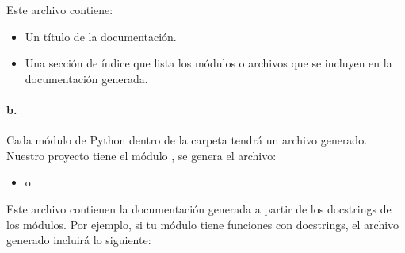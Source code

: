 \documentclass[a4paper,10pt,spanish]{sphinxmanual}
\begin{document}
\sphinxAtStartPar
Este archivo contiene:
\begin{itemize}
\item {} 
\sphinxAtStartPar
Un título de la documentación.

\item {} 
\sphinxAtStartPar
Una sección de índice que lista los módulos o archivos que se incluyen en la documentación generada.

\end{itemize}


\paragraph{b. }
\label{\detokenize{configuracion_inicial/007.Creacion_de_ficheros_de_codigo_y_generacion_automatica_de_documentacion:b-archivos-rst-o-md-para-cada-modulo-python}}
\sphinxAtStartPar
Cada módulo de Python dentro de la carpeta  tendrá un archivo generado. Nuestro proyecto tiene el módulo
, se genera el archivo:
\begin{itemize}
\item {} 
\sphinxAtStartPar
{} o 

\end{itemize}

\sphinxAtStartPar
Este archivo contienen la documentación generada a partir de los docstrings de los módulos. Por ejemplo, si tu módulo  tiene funciones con docstrings, el archivo generado incluirá lo siguiente:

\begin{sphinxVerbatim}[commandchars=\\\{\}]
\PYGZbs{} 

  


\end{sphinxVerbatim}
\end{document}
